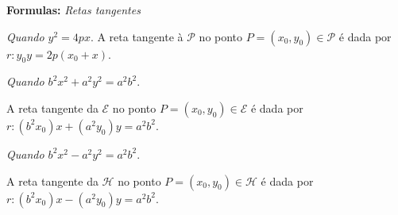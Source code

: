 \documentclass[11pt]{exam}
\begin{document}
 {\bf Formulas: }
 {\it Retas tangentes }
 
 {\it Quando $y^2=4px$}. 
 A reta tangente à $\mathcal{P}$ no ponto $P=(x_0,y_0) \in \mathcal{P}$ é dada por $ r: y_{0}y=2p(x_0+x)$.
  
 {\it Quando $b^2 x^2+a^2y^2=a^2b^2$}.
  
 A reta tangente da $\mathcal{E}$ no ponto $P=(x_0,y_0) \in \mathcal{E}$ é dada por 
 $ r: (b^2x_{0})x+(a^2 y_0)y=a^2b^2$. 
 
 {\it Quando $b^2 x^2-a^2y^2=a^2b^2$}. 
 
 A reta tangente da $\mathcal{H}$ no ponto $P=(x_0,y_0) \in \mathcal{H}$ é dada por $ r: (b^2 x_{0})x-(a^2 y_0)y=a^2b^2$.
 
 
 
\end{document}
